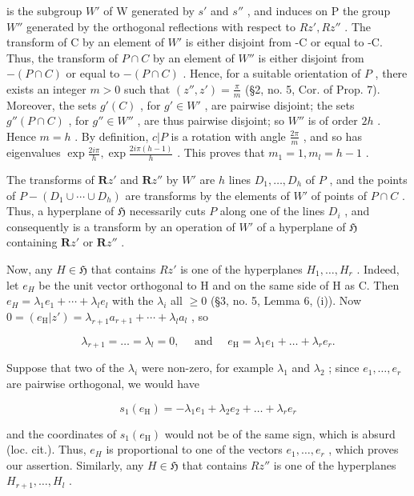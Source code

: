 is the subgroup \(W'\) of W generated by \(s'\) and \(s''\) , and induces on P the group \(W''\) generated by the orthogonal reflections with respect to \(Rz', Rz''\) . The transform of C by an element of \(W'\) is either disjoint from -C or equal to -C. Thus, the transform of \(P \cap C\) by an element of \(W''\) is either disjoint from \(-(P \cap C)\) or equal to \(-(P \cap C)\) . Hence, for a suitable orientation of \(P\) , there exists an integer \(m > 0\) such that \((z'', z') = \frac{\pi}{m}\) (§2, no. 5, Cor. of Prop. 7). Moreover, the sets \(g'(C)\) , for \(g' \in W'\) , are pairwise disjoint; the sets \(g''(P \cap C)\) , for \(g'' \in W''\) , are thus pairwise disjoint; so \(W''\) is of order \(2h\) . Hence \(m = h\) . By definition, \(c|P\) is a rotation with angle \(\frac{2\pi}{m}\) , and so has eigenvalues \(\exp \frac{2i\pi}{h}, \exp \frac{2i\pi(h - 1)}{h}\) . This proves that \(m_1 = 1, m_l = h - 1\) .

The transforms of \(\mathbf{R}z'\) and \(\mathbf{R}z''\) by \(W'\) are \(h\) lines \(D_1, \ldots, D_h\) of \(P\) , and the points of \(P - (D_1 \cup \cdots \cup D_h)\) are transforms by the elements of \(W'\) of points of \(P \cap C\) . Thus, a hyperplane of \(\mathfrak{H}\) necessarily cuts \(P\) along one of the lines \(D_i\) , and consequently is a transform by an operation of \(W'\) of a hyperplane of \(\mathfrak{H}\) containing \(\mathbf{R}z'\) or \(\mathbf{R}z''\) .

Now, any \(H \in \mathfrak{H}\) that contains \(Rz'\) is one of the hyperplanes \(H_{1}, \ldots, H_{r}\) . Indeed, let \(e_{H}\) be the unit vector orthogonal to H and on the same side of H as C. Then \(e_{H} = \lambda_{1}e_{1} + \cdots + \lambda_{l}e_{l}\) with the \(\lambda_{i}\) all \(\geqslant 0\) (§3, no. 5, Lemma 6, (i)). Now \(0 = (e_{\mathrm{H}}|z') = \lambda_{r+1}a_{r+1} + \cdots + \lambda_{l}a_{l}\) , so

\[
\lambda_ {r + 1} = \dots = \lambda_ {l} = 0, \quad \text { and } \quad e _ {\mathrm{H}} = \lambda_ {1} e _ {1} + \dots + \lambda_ {r} e _ {r}.
\]

Suppose that two of the \(\lambda_{i}\) were non-zero, for example \(\lambda_{1}\) and \(\lambda_{2}\) ; since \(e_{1},\ldots,e_{r}\) are pairwise orthogonal, we would have

\[
s _ {1} (e _ {\mathrm{H}}) = - \lambda_ {1} e _ {1} + \lambda_ {2} e _ {2} + \dots + \lambda_ {r} e _ {r}
\]

and the coordinates of \(s_{1}(e_{\mathrm{H}})\) would not be of the same sign, which is absurd (loc. cit.). Thus, \(e_{H}\) is proportional to one of the vectors \(e_{1},\ldots,e_{r}\) , which proves our assertion. Similarly, any \(H\in \mathfrak{H}\) that contains \(Rz''\) is one of the hyperplanes \(H_{r+1},\ldots,H_{l}\) .


